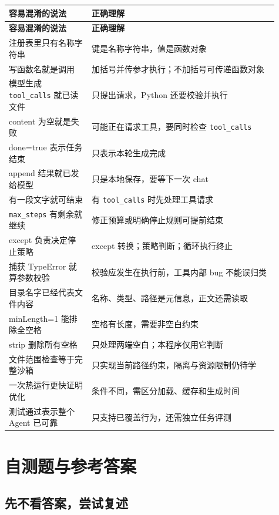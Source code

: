 {\small\setlength{\tabcolsep}{4pt}
\renewcommand{\arraystretch}{1.25}
\begin{longtable}{>{\raggedright\arraybackslash}p{0.28\linewidth}>{\raggedright\arraybackslash}p{0.63\linewidth}}
\toprule
\textbf{容易混淆的说法} & \textbf{正确理解} \\
\midrule\endfirsthead
\toprule
\textbf{容易混淆的说法} & \textbf{正确理解} \\
\midrule\endhead
\bottomrule\endfoot
注册表里只有名称字符串 & 键是名称字符串，值是函数对象 \\
写函数名就是调用 & 加括号并传参才执行；不加括号可传递函数对象 \\
模型生成 \nolinkurl{tool_calls} 就已读文件 & 只提出请求，Python 还要校验并执行 \\
content 为空就是失败 & 可能正在请求工具，要同时检查 \nolinkurl{tool_calls} \\
done=true 表示任务结束 & 只表示本轮生成完成 \\
append 结果就已发给模型 & 只是本地保存，要等下一次 chat \\
有一段文字就可结束 & 有 \nolinkurl{tool_calls} 时先处理工具请求 \\
\nolinkurl{max_steps} 有剩余就继续 & 修正预算或明确停止规则可提前结束 \\
except 负责决定停止策略 & except 转换；策略判断；循环执行终止 \\
捕获 TypeError 就算参数校验 & 校验应发生在执行前，工具内部 bug 不能误归类 \\
目录名字已经代表文件内容 & 名称、类型、路径是元信息，正文还需读取 \\
minLength=1 能排除全空格 & 空格有长度，需要非空白约束 \\
strip 删除所有空格 & 只处理两端空白；本程序仅用它判断 \\
文件范围检查等于完整沙箱 & 只实现当前路径约束，隔离与资源限制仍待学 \\
一次热运行更快证明优化 & 条件不同，需区分加载、缓存和生成时间 \\
测试通过表示整个 Agent 已可靠 & 只支持已覆盖行为，还需独立任务评测 \\
\end{longtable}}

\section{自测题与参考答案}

\subsection{先不看答案，尝试复述}

